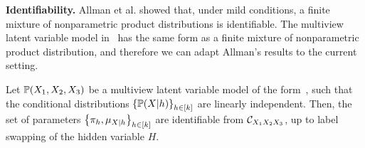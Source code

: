 \documentclass[11pt]{article}
\begin{document}

{\bf Identifiability.} Allman et al. showed that, under mild conditions, a finite mixture of nonparametric product distributions is identifiable. The multiview latent variable model in~ has the same form as a finite mixture of nonparametric product distribution, and therefore we can adapt Allman's results to the current setting.
\begin{theorem}
  Let $\mathbb{P}(X_1,X_2,X_3)$ be a multiview latent variable model of the form~, such that the conditional distributions $\left\{\mathbb{P}(X|h)\right\}_{h \in [k]}$ are linearly independent. Then, the set of parameters $\left\{\pi_h, \mu_{X|h}\right\}_{h \in [k]}$ are identifiable from $\mathcal{C}_{X_1 X_2 X_3}$, up to label swapping of the hidden variable $H$. 
\end{theorem}
\end{document}
